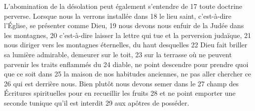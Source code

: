 	L'abomination de la désolation peut également s'entendre de	 
17	 	toute doctrine perverse. Lorsque nous la verrons installée dans	 
18	 	le lieu saint, c'est-à-dire l'Église, se présenter comme Dieu,	 
19	 	nous devons nous enfuir de la Judée dans les montagnes,	 
20	 	c'est-à-dire laisser la lettre qui tue et la perversion judaïque,	 
21	 	nous diriger vers les montagnes éternelles, du haut desquelles	 
22	 	Dieu fait briller sa lumière admirable, demeurer sur le toit,	 
23	 	sur la terrasse où ne peuvent parvenir les traits enflammés du	 
24	 	diable, ne point descendre pour prendre quoi que ce soit dans	 
25	 	la maison de nos habitudes anciennes, ne pas aller chercher ce	 
26	 	qui est derrière nous. Bien plutôt nous devons semer dans le	 
27	 	champ des Écritures spirituelles pour en recueillir les fruits	 
28	 	et ne point emporter une seconde tunique qu'il est interdit	 
29	 	aux apôtres de posséder.